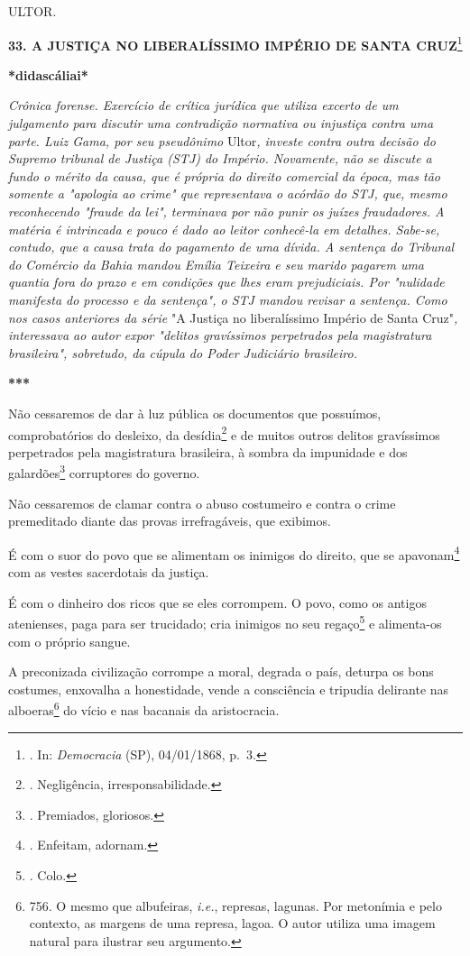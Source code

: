 ULTOR.

\textbf{33. A JUSTIÇA NO LIBERALÍSSIMO IMPÉRIO DE SANTA CRUZ}\footnote{.
  In: \emph{Democracia} (SP), 04/01/1868, p.~3.}

\textbf{*didascáliai*}

\emph{Crônica forense. Exercício de crítica jurídica que utiliza excerto
de um julgamento para discutir uma contradição normativa ou injustiça
contra uma parte. Luiz Gama, por seu pseudônimo} Ultor\emph{, investe
contra outra decisão do Supremo tribunal de Justiça (STJ) do Império.
Novamente, não se discute a fundo o mérito da causa, que é própria do
direito comercial da época, mas tão somente a "apologia ao crime" que
representava o acórdão do STJ, que, mesmo reconhecendo "fraude da lei",
terminava por não punir os juízes fraudadores. A matéria é intrincada e
pouco é dado ao leitor conhecê-la em detalhes. Sabe-se, contudo, que a
causa trata do pagamento de uma dívida. A sentença do Tribunal do
Comércio da Bahia mandou Emília Teixeira e seu marido pagarem uma
quantia fora do prazo e em condições que lhes eram prejudiciais. Por
"nulidade manifesta do processo e da sentença", o STJ mandou revisar a
sentença. Como nos casos anteriores da série} "A Justiça no
liberalíssimo Império de Santa Cruz"\emph{, interessava ao autor expor
"delitos gravíssimos perpetrados pela magistratura brasileira",
sobretudo, da cúpula do Poder Judiciário brasileiro.}

\textbf{***}

Não cessaremos de dar à luz pública os documentos que possuímos,
comprobatórios do desleixo, da desídia\footnote{. Negligência,
  irresponsabilidade.} e de muitos outros delitos gravíssimos
perpetrados pela magistratura brasileira, à sombra da impunidade e dos
galardões\footnote{. Premiados, gloriosos.} corruptores do governo.

Não cessaremos de clamar contra o abuso costumeiro e contra o crime
premeditado diante das provas irrefragáveis, que exibimos.

É com o suor do povo que se alimentam os inimigos do direito, que se
apavonam\footnote{. Enfeitam, adornam.} com as vestes sacerdotais da
justiça.

É com o dinheiro dos ricos que se eles corrompem. O povo, como os
antigos atenienses, paga para ser trucidado; cria inimigos no seu
regaço\footnote{. Colo.} e alimenta-os com o próprio sangue.

A preconizada civilização corrompe a moral, degrada o país, deturpa os
bons costumes, enxovalha a honestidade, vende a consciência e tripudia
delirante nas alboeras\footnote{756. O mesmo que albufeiras,
  \emph{i.e.}, represas, lagunas. Por metonímia e pelo contexto, as
  margens de uma represa, lagoa. O autor utiliza uma imagem natural para
  ilustrar seu argumento.} do vício e nas bacanais da aristocracia.

